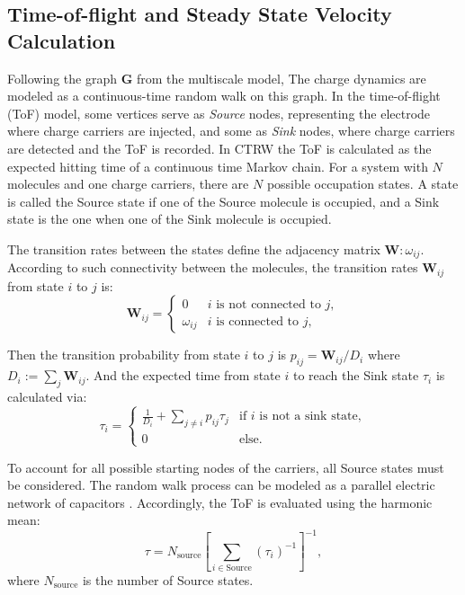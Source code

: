 \documentclass[%
 reprint,
 amsmath,amssymb,
 aps,
]{revtex4-2}
\begin{document}
\subsection{Time-of-flight and Steady State Velocity Calculation}
Following the graph $\mathbf{G}$ from the multiscale model,
The charge dynamics are modeled as a continuous-time random walk on this graph. In the time-of-flight (ToF) model, some vertices serve as \textit{Source} nodes, representing the electrode where charge carriers are injected, and some as \textit{Sink} nodes, where charge carriers are detected and the ToF is recorded.
In CTRW the ToF is calculated as the expected hitting time of a continuous time Markov chain.
For a system with $N$ molecules and one charge carriers, there are $N$ possible occupation states. A state is called the Source state if one of the Source molecule is occupied, and a Sink state is the one when one of the Sink molecule is occupied.

The transition rates between the states define the adjacency matrix $\mathbf{W}:\omega_{ij}$.
According to such connectivity between the molecules, the transition rates $\mathbf{W}_{ij}$ from state $i$ to $j$ is:
\begin{equation}\label{eq:transition_rates}
	\mathbf{W}_{ij} =
	\begin{cases}
	     0			&  i \text{ is not connected to } j,\\
         \omega_{ij}   &  i \text{ is connected to } j,
	\end{cases}
\end{equation}

Then the transition probability from state $i$ to $j$ is $p_{ij} = \mathbf{W}_{ij}/D_i$ where $D_i := \sum_{j} \mathbf{W}_{ij}$.
And the expected time from state $i$ to reach the Sink state $\tau_i$ is calculated via: 
\begin{equation}\label{eq:hitting_time}
	\tau_i = \begin{cases}
		\frac{1}{D_i} + \sum_{j \ne i} p_{ij} \tau_{j} &\text{if $i$ is not a sink state},\\
		0 &\text{else.} 
	\end{cases}
\end{equation} 

To account for all possible starting nodes of the carriers, all Source states must be considered. The random walk process can be modeled as a parallel electric network of capacitors \cite{doyle_random_1984}. Accordingly, the ToF is evaluated using the harmonic mean:
\begin{equation} 
\tau = N_\text{source} \left[\sum_{i \in \text{Source}} (\tau_i)^{-1}\right]^{-1},
\label{eq:ToF}
\end{equation}
where $N_\text{source}$ is the number of Source states.
\end{document}
